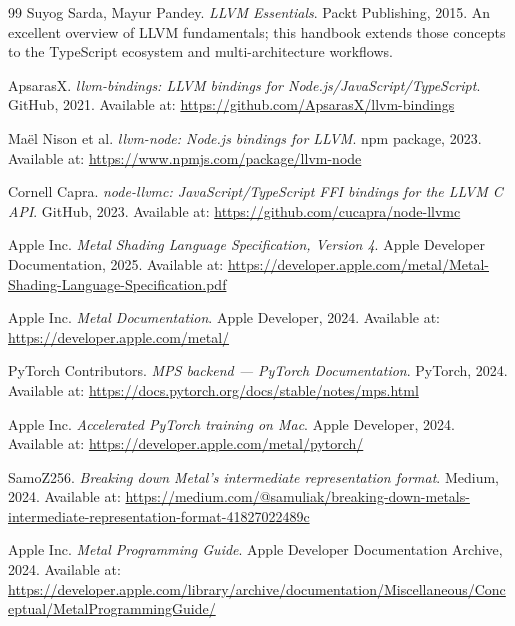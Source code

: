 \documentclass[11pt]{article}
\begin{document}
\begin{thebibliography}{99}
Suyog Sarda, Mayur Pandey. \textit{LLVM Essentials}. Packt Publishing, 2015. An excellent overview of LLVM fundamentals; this handbook extends those concepts to the TypeScript ecosystem and multi-architecture workflows.

ApsarasX. \textit{llvm-bindings: LLVM bindings for Node.js/JavaScript/TypeScript}. GitHub, 2021. Available at: \url{https://github.com/ApsarasX/llvm-bindings}

Maël Nison et al. \textit{llvm-node: Node.js bindings for LLVM}. npm package, 2023. Available at: \url{https://www.npmjs.com/package/llvm-node}

Cornell Capra. \textit{node-llvmc: JavaScript/TypeScript FFI bindings for the LLVM C API}. GitHub, 2023. Available at: \url{https://github.com/cucapra/node-llvmc}

Apple Inc. \textit{Metal Shading Language Specification, Version 4}. Apple Developer Documentation, 2025. Available at: \url{https://developer.apple.com/metal/Metal-Shading-Language-Specification.pdf}

Apple Inc. \textit{Metal Documentation}. Apple Developer, 2024. Available at: \url{https://developer.apple.com/metal/}

PyTorch Contributors. \textit{MPS backend --- PyTorch Documentation}. PyTorch, 2024. Available at: \url{https://docs.pytorch.org/docs/stable/notes/mps.html}

Apple Inc. \textit{Accelerated PyTorch training on Mac}. Apple Developer, 2024. Available at: \url{https://developer.apple.com/metal/pytorch/}

SamoZ256. \textit{Breaking down Metal's intermediate representation format}. Medium, 2024. Available at: \url{https://medium.com/@samuliak/breaking-down-metals-intermediate-representation-format-41827022489c}

Apple Inc. \textit{Metal Programming Guide}. Apple Developer Documentation Archive, 2024. Available at: \url{https://developer.apple.com/library/archive/documentation/Miscellaneous/Conceptual/MetalProgrammingGuide/}
\end{thebibliography}
\end{document}
